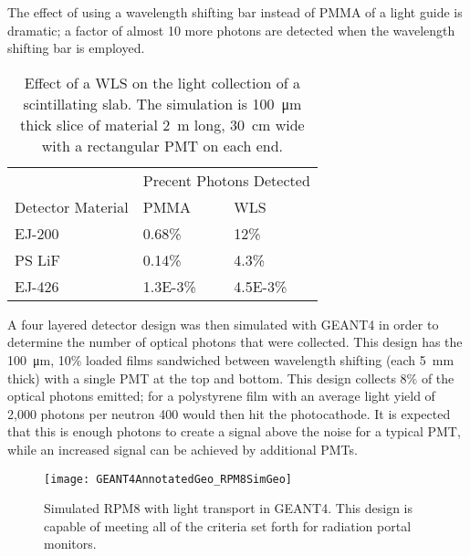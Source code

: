 The effect of using a wavelength shifting bar instead of PMMA of a light guide is dramatic; a factor of almost 10 more photons are detected when the wavelength shifting bar is employed.
  \begin{table}
  \caption[Light Collection Increase with a WLS Bar]{Effect of a WLS on the light collection of a scintillating slab. The simulation is \SI{100}{\um} thick slice of material \SI{2}{\m} long, \SI{30}{\cm} wide with a rectangular PMT on each end.}
  \label{tab:WLSStudy}
  \begin{tabular}{p{4cm} m{3cm} m{3cm}}
  \toprule
  & \multicolumn{2}{c}{Precent Photons Detected} \\
  Detector Material & PMMA &  WLS \\
  \midrule
 EJ-200 & 0.68\%  & 12\% \\
 PS LiF & 0.14\% & 4.3\% \\
 EJ-426 & \num{1.3E-3}\% & \num{4.5E-3}\% \\
 \bottomrule
  \end{tabular}
\end{table}

A four layered detector design was then simulated with GEANT4 in order to determine the number of optical photons that were collected.
This design has the \SI{100}{\um}, 10\% loaded  films sandwiched between wavelength shifting (each \SI{5}{\mm} thick) with a single PMT at the top and bottom.
This design collects 8\% of the optical photons emitted; for a polystyrene film with an average light yield of 2,000 photons per neutron 400 would then hit the photocathode.
It is expected that this is enough photons to create a signal above the noise for a typical PMT, while an increased signal can be achieved by additional PMTs.
\begin{figure}
  \centering
	\texttt{[image: GEANT4AnnotatedGeo\_RPM8SimGeo]}
	  \caption[GEANT4 Simulated RPM8 Detector Design]{Simulated RPM8 with light transport in GEANT4. This design is capable of meeting all of the criteria set forth for radiation portal monitors.}
  \label{fig:G4RPM8Geo}
\end{figure}

